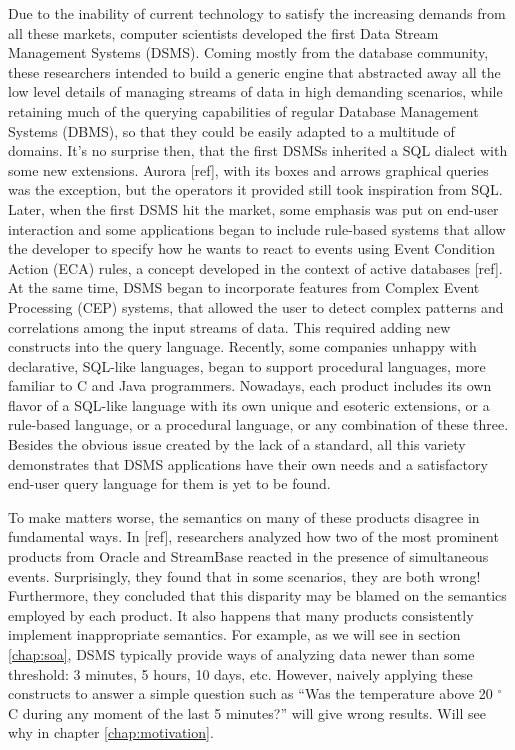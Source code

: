 \documentclass{report}
\begin{document}
Due to the inability of current technology to satisfy the increasing
demands from all these markets, computer scientists developed the
first Data Stream Management Systems (DSMS). Coming mostly from the
database community, these researchers intended to build a generic
engine that abstracted away all the low level details of managing
streams of data in high demanding scenarios, while retaining much of
the querying capabilities of regular Database Management Systems
(DBMS), so that they could be easily adapted to a multitude of
domains. It's no surprise then, that the first DSMSs inherited a SQL
dialect with some new extensions. Aurora [ref], with its boxes and
arrows graphical queries was the exception, but the operators it
provided still took inspiration from SQL. Later, when the first DSMS
hit the market, some emphasis was put on end-user interaction and some
applications began to include rule-based systems that allow the
developer to specify how he wants to react to events using Event
Condition Action (ECA) rules, a concept developed in the context of
active databases [ref]. At the same time, DSMS began to incorporate
features from Complex Event Processing (CEP) systems, that allowed the
user to detect complex patterns and correlations among the input
streams of data. This required adding new constructs into the query
language. Recently, some companies unhappy with declarative, SQL-like
languages, began to support procedural languages, more familiar to C
and Java programmers. Nowadays, each product includes its own flavor
of a SQL-like language with its own unique and esoteric extensions, or
a rule-based language, or a procedural language, or any combination of
these three. Besides the obvious issue created by the lack of a
standard, all this variety demonstrates that DSMS applications have
their own needs and a satisfactory end-user query language for them is
yet to be found.

To make matters worse, the semantics on many of these products
disagree in fundamental ways. In [ref], researchers analyzed how two
of the most prominent products from Oracle and StreamBase reacted in
the presence of simultaneous events. Surprisingly, they found that in
some scenarios, they are both wrong! Furthermore, they concluded that
this disparity may be blamed on the semantics employed by each
product. It also happens that many products consistently implement
inappropriate semantics. For example, as we will see in section
\ref{chap:soa}, DSMS typically provide ways of analyzing data newer
than some threshold: 3 minutes, 5 hours, 10 days, etc. However,
naively applying these constructs to answer a simple question such as
``Was the temperature above 20 $^{\circ}$C during any moment of the
last 5 minutes?'' will give wrong results. Will see why in chapter
\ref{chap:motivation}.
\end{document}
